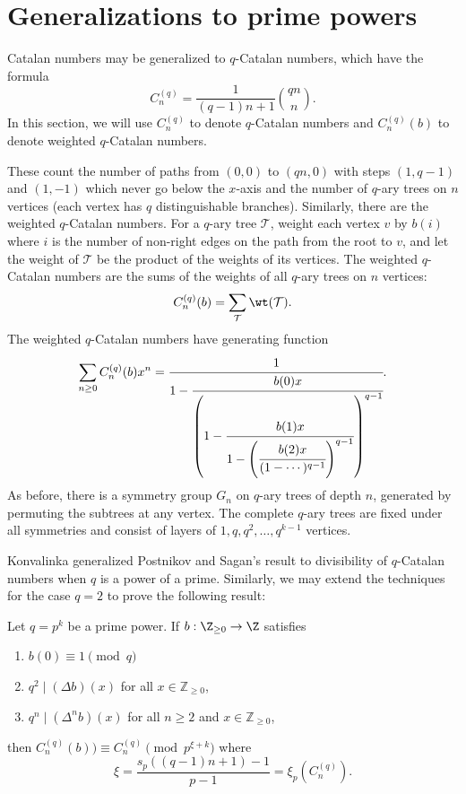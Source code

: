 \section{Generalizations to prime powers}\label{sec:generalization}

Catalan numbers may be generalized to $q$-Catalan numbers, which have the formula 
\[C^{(q)}_n=\frac{1}{(q-1)n+1}\binom{qn}{n}.\]
In this section, we will use $C^{(q)}_n$ to denote $q$-Catalan numbers and $C^{(q)}_n(b)$ to denote weighted $q$-Catalan numbers.

These count the number of paths from $(0, 0)$ to $(qn, 0)$ with steps $(1, q-1)$ and $(1, -1)$ which never go below the $x$-axis and the number of $q$-ary trees on $n$ vertices (each vertex has $q$ distinguishable branches). Similarly, there are the weighted $q$-Catalan numbers. For a $q$-ary tree $\mathcal{T}$, weight each vertex $v$ by $b(i)$ where $i$ is the number of non-right edges on the path from the root to $v$, and let the weight of $\mathcal{T}$ be the product of the weights of its vertices. The weighted $q$-Catalan numbers are the sums of the weights of all $q$-ary trees on $n$ vertices:
\[C_n^{(q)}(b)=\sum_{\mathcal{T}}\wt(\mathcal{T}).\]
The weighted $q$-Catalan numbers have generating function
\[\sum_{n\geq0}C_n^{(q)}(b)x^n=\cfrac{1}{1-\cfrac{b(0)x}{\left(1-\cfrac{b(1)x}{1-\left(\cfrac{b(2)x}{(1-\cdots)^{q-1}}\right)^{q-1}}\right)^{q-1}}}.\]
As before, there is a symmetry group $G_n$ on $q$-ary trees of depth $n$, generated by permuting the subtrees at any vertex. The complete $q$-ary trees are fixed under all symmetries and consist of layers of $1, q, q^2, \dotsc, q^{k-1}$ vertices.

Konvalinka \cite{konvalinka2007divisibility} generalized Postnikov and Sagan's result to divisibility of $q$-Catalan numbers when $q$ is a power of a prime. Similarly, we may extend the techniques for the case $q=2$ to prove the following result:

\begin{theorem}\label{thm:qmain}
Let $q=p^k$ be a prime power. If $b: \Z_{\geq 0}\to\Z$ satisfies 
\begin{enumerate}
    \item $b(0)\equiv 1\pmod{q}$
    \item $q^2\mid (\Delta b)(x)$ for all $x\in\mathbb{Z}_{\geq 0}$,
    \item $q^n\mid (\Delta^nb)(x)$ for all $n\geq 2$ and $x\in \mathbb{Z}_{\geq 0}$,
\end{enumerate}
then
$C_n^{(q)}(b))\equiv C_n^{(q)}\pmod{p^{\xi+k}}$
where
\[\xi = \frac{s_p((q-1)n+1)-1}{p-1}=\xi_p(C_n^{(q)}).\]
\end{theorem}

